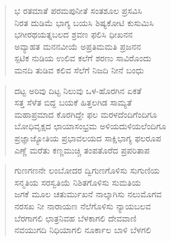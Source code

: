 \begin{verse}
ಭ ರತಮಾತೆ ಪರಮಪುನೀತೆ ಸಂತಶೂಲ ಪ್ರಸವಿಸಿ\\
ನಿರತ ದುಡಿಮೆ ಭಾಗ್ಯ ಬಯಸಿ ಶಿಷ್ಯಕೋಟಿ ಕುಸುಮಿಸಿ\\
ಭಗೀರಥಯತ್ನಬಲದ ಶ್ರವಣ ಫಲಿಸಿ ಧೀಖನನ\\
ಅವ್ಯಾಹತ ಮನನವೀಯೆ ಅಪ್ರತಿಮಮತಿ ಪ್ರಜನನ\\
ಸ್ಪಟಿಕ ನುಡಿಯ ಉಲಿವ ಕಲೆಗೆ ಶರಣು ಸಾವಿರೊಂದು\\
ಮನದಿ ತುಡಿವ ಕಲಿವ ಸೆಲೆಗೆ ನಿಜದಿ ನೀನೆ ಬಂಧು
\end{verse}
\begin{verse}
ದಟ್ಟ ಅರಿವು ದಿಟ್ಟ ನಿಲುವು ಒಳ-ಹೊರಗಿನ ಏಕತೆ\\
ಸತ್ತ ಸೆಳೆತ ಬಿದ್ದ ಬಯಕೆ ಹಿತ್ತಲಗಿಡ ಸಾಮ್ಯತೆ\\
ಮಹಾಪ್ರಮಾದ ಕೊರಗಿದ್ದೇ ಫಲ ಮರಳದೆಂದಿಗೆಂದಿಗೂ\\
ಬೋಧಿವೃಕ್ಷದ ಛಾಯಾಸಂಭ್ರಮ ಅಳಿಯದುಳಿಯಲೆಂದಿಗೂ\\
ಪ್ರಜ್ಞಾಜ್ಯೋತಿಯ ಪ್ರಭಾವಲಯದ ಸಾಕ್ಷಿಭಾಗ್ಯ ಫಲರೂಪ\\
ಎಣ್ಣೆ ಮರೆತು ಕಣ್ಣಮುಚ್ಚಿ ತಂಪತೊರೆದ ಪ್ರಪರಿತಾಪ
\end{verse}
\begin{verse}
ಗುಣಗಣನೇ ಲಂಬೋದರ ದ್ವಿಗುಣಗೊಳಿಸು ಸುಗುಣಿಯ\\
ಸನ್ಮತಿಯ ಸರಸ್ವತಿಯೆ ನಿಶಿತಗೊಳಿಸು ಸುಮತಿಯ\\
ಜಗಕೆ ಮೂಲ ಚತುರ್ಮುಖನೆ ನಾಲ್ಕಾಗಿಸು ನಲುಮೊಗವ\\
ನರಸಖ ನೀ ನಾರಾಯಣ ನೆಲೆಗೊಳಿಸು ನ್ಯಾಯಬಲವ\\
ಬೆರಗಾಗಲಿ ಛಾತ್ರನಿವಹ ಬೆಳಕಾಗಲಿ ದೇವವಾಣಿ\\
ನವಯುಗದಿ ನಿಧಿಯಾಗಲಿ ನೂರ್ಕಾಲ ಬಾಳಿ ಬೆಳಗಲಿ
\end{verse}
